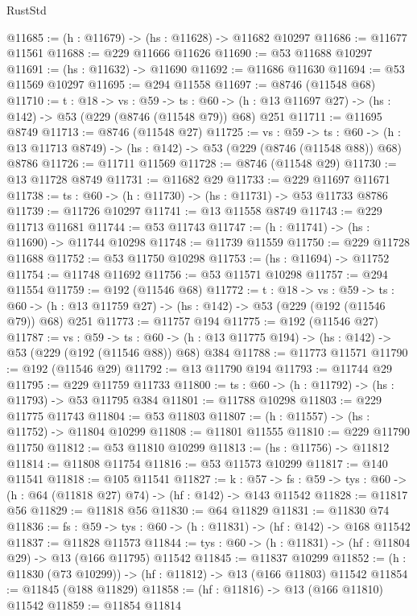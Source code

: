 \begin{lexlean}{RustStd}
\begin{coremodule}
@11685 := (h : @11679) -> (hs : @11628) -> @11682 @10297
@11686 := @11677 @11561
@11688 := @229 @11666 @11626
@11690 := @53 @11688 @10297
@11691 := (hs : @11632) -> @11690
@11692 := @11686 @11630
@11694 := @53 @11569 @10297
@11695 := @294 @11558
@11697 := @8746 (@11548 @68)
@11710 := {t : @18} ->
  {vs : @59} ->
  {ts : @60} -> (h : @13 @11697 @27) -> (hs : @142) -> @53 (@229 (@8746 (@11548 @79)) @68) @251
@11711 := @11695 @8749
@11713 := @8746 (@11548 @27)
@11725 := {vs : @59} ->
  {ts : @60} -> (h : @13 @11713 @8749) -> (hs : @142) -> @53 (@229 (@8746 (@11548 @88)) @68) @8786
@11726 := @11711 @11569
@11728 := @8746 (@11548 @29)
@11730 := @13 @11728 @8749
@11731 := @11682 @29
@11733 := @229 @11697 @11671
@11738 := {ts : @60} -> (h : @11730) -> (hs : @11731) -> @53 @11733 @8786
@11739 := @11726 @10297
@11741 := @13 @11558 @8749
@11743 := @229 @11713 @11681
@11744 := @53 @11743
@11747 := (h : @11741) -> (hs : @11690) -> @11744 @10298
@11748 := @11739 @11559
@11750 := @229 @11728 @11688
@11752 := @53 @11750 @10298
@11753 := (hs : @11694) -> @11752
@11754 := @11748 @11692
@11756 := @53 @11571 @10298
@11757 := @294 @11554
@11759 := @192 (@11546 @68)
@11772 := {t : @18} ->
  {vs : @59} ->
  {ts : @60} -> (h : @13 @11759 @27) -> (hs : @142) -> @53 (@229 (@192 (@11546 @79)) @68) @251
@11773 := @11757 @194
@11775 := @192 (@11546 @27)
@11787 := {vs : @59} ->
  {ts : @60} -> (h : @13 @11775 @194) -> (hs : @142) -> @53 (@229 (@192 (@11546 @88)) @68) @384
@11788 := @11773 @11571
@11790 := @192 (@11546 @29)
@11792 := @13 @11790 @194
@11793 := @11744 @29
@11795 := @229 @11759 @11733
@11800 := {ts : @60} -> (h : @11792) -> (hs : @11793) -> @53 @11795 @384
@11801 := @11788 @10298
@11803 := @229 @11775 @11743
@11804 := @53 @11803
@11807 := (h : @11557) -> (hs : @11752) -> @11804 @10299
@11808 := @11801 @11555
@11810 := @229 @11790 @11750
@11812 := @53 @11810 @10299
@11813 := (hs : @11756) -> @11812
@11814 := @11808 @11754
@11816 := @53 @11573 @10299
@11817 := @140 @11541
@11818 := @105 @11541
@11827 := {k : @57} ->
  {fs : @59} -> {tys : @60} -> (h : @64 (@11818 @27) @74) -> (hf : @142) -> @143 @11542
@11828 := @11817 @56
@11829 := @11818 @56
@11830 := @64 @11829
@11831 := @11830 @74
@11836 := {fs : @59} -> {tys : @60} -> (h : @11831) -> (hf : @142) -> @168 @11542
@11837 := @11828 @11573
@11844 := {tys : @60} -> (h : @11831) -> (hf : @11804 @29) -> @13 (@166 @11795) @11542
@11845 := @11837 @10299
@11852 := (h : @11830 (@73 @10299)) -> (hf : @11812) -> @13 (@166 @11803) @11542
@11854 := @11845 (@188 @11829)
@11858 := (hf : @11816) -> @13 (@166 @11810) @11542
@11859 := @11854 @11814

\end{coremodule}
\end{lexlean}
